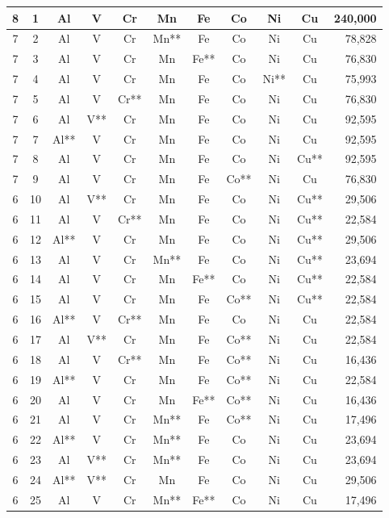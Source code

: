 \documentclass[final,5p,times,twocolumn]{elsarticle}
\begin{document}
\begin{longtable}{ccccccccccr}
8 & 1  & Al & V  & Cr & Mn & Fe & Co & Ni & Cu & 240{,}000 \\
\hline
7 & 2  & Al & V  & Cr & Mn** & Fe & Co & Ni & Cu & 78{,}828 \\
7 & 3  & Al & V  & Cr & Mn & Fe** & Co & Ni & Cu & 76{,}830 \\
7 & 4  & Al & V  & Cr & Mn & Fe & Co & Ni** & Cu & 75{,}993 \\
7 & 5  & Al & V  & Cr** & Mn & Fe & Co & Ni & Cu & 76{,}830 \\
7 & 6  & Al & V** & Cr & Mn & Fe & Co & Ni & Cu & 92{,}595 \\
7 & 7  & Al** & V  & Cr & Mn & Fe & Co & Ni & Cu & 92{,}595 \\
7 & 8  & Al & V  & Cr & Mn & Fe & Co & Ni & Cu** & 92{,}595 \\
7 & 9  & Al & V  & Cr & Mn & Fe & Co** & Ni & Cu & 76{,}830 \\
\hline
6 & 10 & Al & V** & Cr & Mn & Fe & Co & Ni & Cu** & 29{,}506 \\
6 & 11 & Al & V  & Cr** & Mn & Fe & Co & Ni & Cu** & 22{,}584 \\
6 & 12 & Al** & V  & Cr & Mn & Fe & Co & Ni & Cu** & 29{,}506 \\
6 & 13 & Al & V  & Cr & Mn** & Fe & Co & Ni & Cu** & 23{,}694 \\
6 & 14 & Al & V  & Cr & Mn & Fe** & Co & Ni & Cu** & 22{,}584 \\
6 & 15 & Al & V  & Cr & Mn & Fe & Co** & Ni & Cu** & 22{,}584 \\
6 & 16 & Al** & V  & Cr** & Mn & Fe & Co & Ni & Cu & 22{,}584 \\
6 & 17 & Al & V** & Cr & Mn & Fe & Co** & Ni & Cu & 22{,}584 \\
6 & 18 & Al & V  & Cr** & Mn & Fe & Co** & Ni & Cu & 16{,}436 \\
6 & 19 & Al** & V  & Cr & Mn & Fe & Co** & Ni & Cu & 22{,}584 \\
6 & 20 & Al & V  & Cr & Mn & Fe** & Co** & Ni & Cu & 16{,}436 \\
6 & 21 & Al & V  & Cr & Mn** & Fe & Co** & Ni & Cu & 17{,}496 \\
6 & 22 & Al** & V  & Cr & Mn** & Fe & Co & Ni & Cu & 23{,}694 \\
6 & 23 & Al & V** & Cr & Mn** & Fe & Co & Ni & Cu & 23{,}694 \\
6 & 24 & Al** & V** & Cr & Mn & Fe & Co & Ni & Cu & 29{,}506 \\
6 & 25 & Al & V  & Cr & Mn** & Fe** & Co & Ni & Cu & 17{,}496 \\

\end{longtable}
\end{document}
